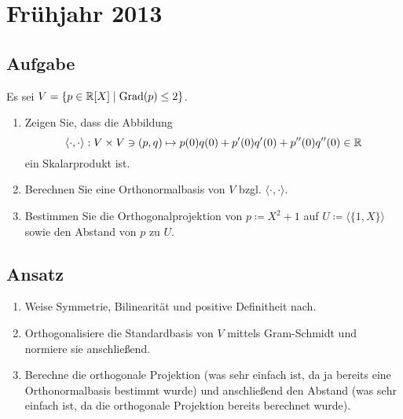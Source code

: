 \newpage

\section{Frühjahr 2013}

\subsection{Aufgabe}
Es sei \( V = \{ p \in \mathbb{R}[X] \mid \text{Grad}(p) \leq 2 \} \).
\begin{enumerate}
	\item Zeigen Sie, dass die Abbildung
	\begin{equation*}
	  	\langle \cdot, \cdot \rangle: V \times V \ni (p,q) \mapsto p(0)q(0)+p'(0)q'(0)+p''(0)q''(0) \in \mathbb{R}
	  \end{equation*}
	  ein Skalarprodukt ist.
	\item Berechnen Sie eine Orthonormalbasis von \( V \) bzgl. \( \langle \cdot, \cdot \rangle \).
	\item Bestimmen Sie die Orthogonalprojektion von \( p \coloneqq X^2+1 \) auf \( U \coloneqq \langle \{ 1,X \} \rangle \) sowie den Abstand von \( p \) zu \( U \).
\end{enumerate}

\subsection{Ansatz}
\begin{enumerate}
	\item Weise Symmetrie, Bilinearität und positive Definitheit nach.
	\item Orthogonalisiere die Standardbasis von \( V \) mittels Gram-Schmidt und normiere sie anschließend.
	\item Berechne die orthogonale Projektion (was sehr einfach ist, da ja bereits eine Orthonormalbasis bestimmt wurde) und anschließend den Abstand (was sehr einfach ist, da die orthogonale Projektion bereits berechnet wurde).
\end{enumerate}

